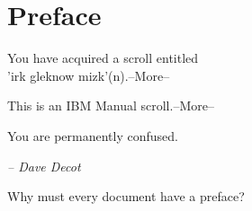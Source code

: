 

\chapter*{Preface}

\begin{flushright}
{ \ttfamily
You have acquired a scroll entitled\\
'irk gleknow mizk'(n).--More--

\medskip
This is an IBM Manual scroll.--More--

\medskip
You are permanently confused.

\bigskip
}	%
{\itshape -- Dave Decot}
\end{flushright}

\begin{comment}
\begin{flushright}
Arnold's Laws of Documentation:
\begin{enumerate}
\item If it should exist, it doesn't.
\item If it does exist, it's out of date.
\item Only documentation for useless programs transcends the
            first two laws.
\end{enumerate}
\end{flushright}
\end{comment}

Why must every document have a preface?


